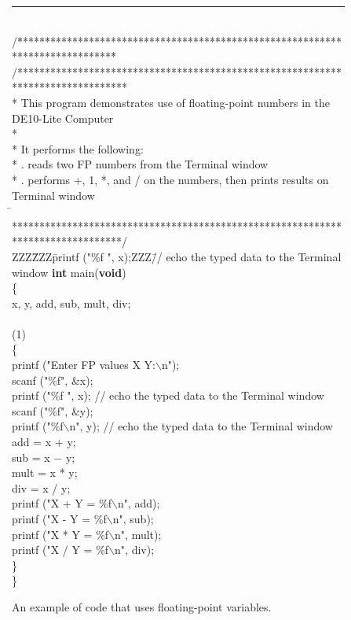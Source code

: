 \begin{figure}[h!]
\begin{center}
\begin{minipage}[t]{12.5 cm}
\begin{tabbing}
\rule{6.0in}{0in}~\\
/\=*****\=*********************************\=****************************************\=\kill
/********************************************************************************\\
\>* This program demonstrates use of floating-point numbers in the DE10-Lite Computer\\
\>*\\
\>* It performs the following: \\
\>* 	. reads two FP numbers from the Terminal window\\
\>* 	. performs +, 1, *, and / on the numbers, then prints results on Terminal window\\
\=\kill
\>********************************************************************************/\\
ZZZ\=ZZZ\=printf ("\%f ", x);ZZZ\=// echo the typed data to the Terminal window\kill
{\bf int} main({\bf void})\\
\{\\
 x, y, add, sub, mult, div;\\
~\\
(1)\\
\>\{\\
\>\>printf ("Enter FP values X Y:$\backslash$n");\\
\>\>scanf ("\%f", \&x);\\
\>\>printf ("\%f ", x);		// echo the typed data to the Terminal window\\
\>\>scanf ("\%f", \&y);\\
\>\>printf ("\%f$\backslash$n", y);		// echo the typed data to the Terminal window\\
\>\>add = x + y;\\
\>\>sub = x $-$ y;\\
\>\>mult = x * y;\\
\>\>div = x / y;\\
\>\>printf ("X + Y = \%f$\backslash$n", add);\\
\>\>printf ("X - Y = \%f$\backslash$n", sub);\\
\>\>printf ("X * Y = \%f$\backslash$n", mult);\\
\>\>printf ("X / Y = \%f$\backslash$n", div);\\
\>\}\\
\}
\end{tabbing}
\end{minipage}
\end{center}
	\vspace{-0.33in}\caption{An example of code that uses floating-point variables.}
   \label{fig:fp}
\end{figure}
